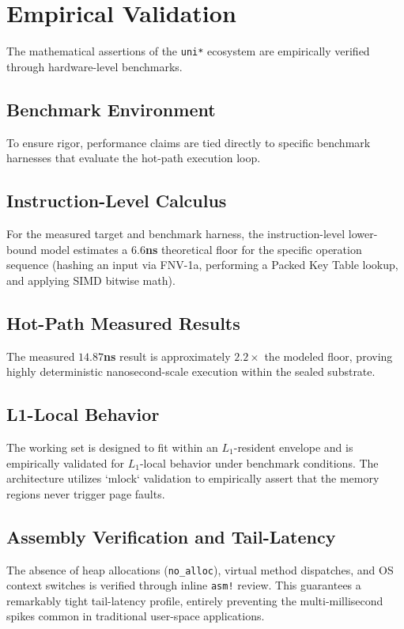 \chapter{Empirical Validation}

The mathematical assertions of the \texttt{uni*} ecosystem are empirically verified through hardware-level benchmarks.

\section{Benchmark Environment}

To ensure rigor, performance claims are tied directly to specific benchmark harnesses that evaluate the hot-path execution loop.

\section{Instruction-Level Calculus}

For the measured target and benchmark harness, the instruction-level lower-bound model estimates a \textbf{$6.6$ns} theoretical floor for the specific operation sequence (hashing an input via FNV-1a, performing a Packed Key Table lookup, and applying SIMD bitwise math).

\section{Hot-Path Measured Results}

The measured \textbf{$14.87$ns} result is approximately $2.2\times$ the modeled floor, proving highly deterministic nanosecond-scale execution within the sealed substrate.

\section{L1-Local Behavior}

The working set is designed to fit within an $L_1$-resident envelope and is empirically validated for $L_1$-local behavior under benchmark conditions. The architecture utilizes `mlock` validation to empirically assert that the memory regions never trigger page faults.

\section{Assembly Verification and Tail-Latency}

The absence of heap allocations (\texttt{no\_alloc}), virtual method dispatches, and OS context switches is verified through inline \texttt{asm!} review. This guarantees a remarkably tight tail-latency profile, entirely preventing the multi-millisecond spikes common in traditional user-space applications.